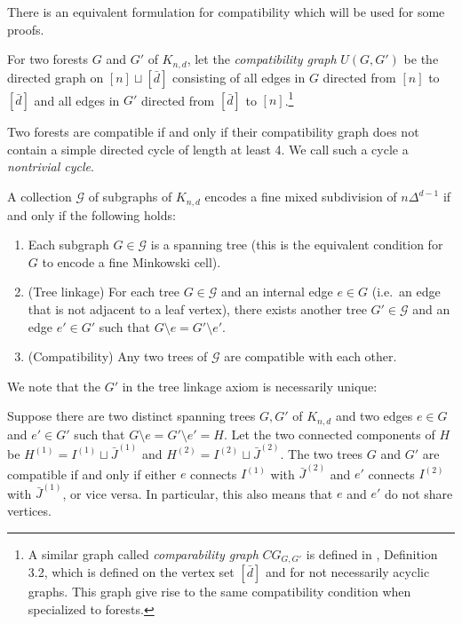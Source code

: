 \documentclass[letterpaper,reqno,11pt]{amsart}
\begin{document}
There is an equivalent formulation for compatibility which will be used for some proofs. 

\begin{definition}
    For two forests $G$ and $G'$ of $K_{n,d}$, let the \emph{compatibility graph} $U(G, G')$ be the directed graph on $[n]\sqcup [\bar{d}]$ consisting of all edges in $G$ directed from $[n]$ to $[\bar{d}]$ and all edges in $G'$ directed from $[\bar{d}]$ to $[n]$.\footnote{A similar graph called \emph{comparability graph} $CG_{G, G'}$ is defined in \cite{TropicalOM}, Definition 3.2, which is defined on the vertex set $[\bar{d}]$ and for not necessarily acyclic graphs. This graph give rise to the same compatibility condition when specialized to forests.} 
\end{definition}

\begin{lemma}    
    Two forests are compatible if and only if their compatibility graph does not contain a simple directed cycle of length at least 4. We call such a cycle a \emph{nontrivial cycle}.
\end{lemma}

\begin{theorem}\label{thm:FMSaxioms}
    A collection $\mathcal{G}$ of subgraphs of $K_{n, d}$ encodes a fine mixed subdivision of $n\Delta^{d-1}$ if and only if the following holds: \begin{enumerate}
        \item Each subgraph $G\in \mathcal{G}$ is a spanning tree (this is the equivalent condition for $G$ to encode a fine Minkowski cell).
        \item \textnormal{(Tree linkage)} For each tree $G\in \mathcal{G}$ and an internal edge $e\in G$ (i.e.\ an edge that is not adjacent to a leaf vertex), there exists another tree $G' \in \mathcal{G}$ and an edge $e'\in G'$ such that $G\setminus e = G' \setminus e'$.
        \item \textnormal{(Compatibility)} Any two trees of $\mathcal{G}$ are compatible with each other.
    \end{enumerate}
\end{theorem}

We note that the $G'$ in the tree linkage axiom is necessarily unique:

\begin{lemma}\label{lem:adjtrees}
    Suppose there are two distinct spanning trees $G, G'$ of $K_{n,d}$ and two edges $e\in G$ and $e'\in G'$ such that $G\setminus e = G' \setminus e' = H$. Let the two connected components of $H$ be $H^{(1)} = I^{(1)}\sqcup \bar{J}^{(1)}$ and $H^{(2)} = I^{(2)}\sqcup \bar{J}^{(2)}$. The two trees $G$ and $G'$ are compatible if and only if either $e$ connects $I^{(1)}$ with $\bar{J}^{(2)}$ and $e'$ connects $I^{(2)}$ with $\bar{J}^{(1)}$, or vice versa. In particular, this also means that $e$ and $e'$ do not share vertices.
\end{lemma}
\end{document}
